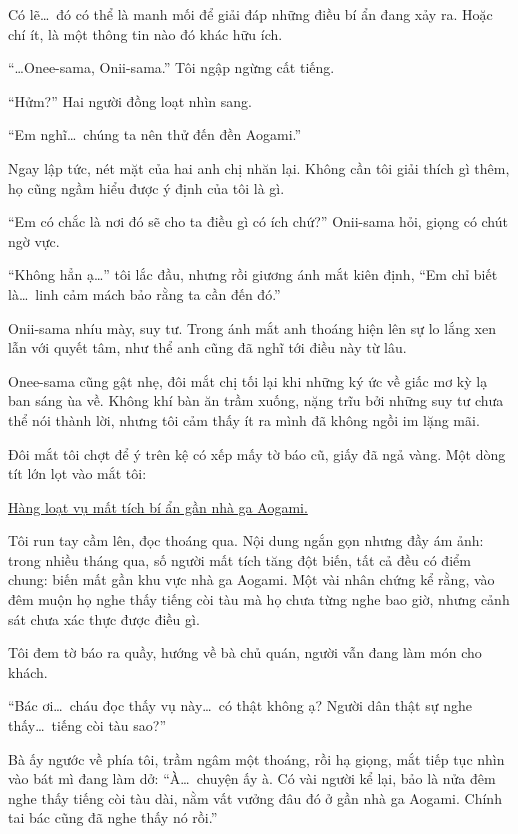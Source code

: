 \documentclass[../main.tex]{subfiles}
\begin{document}
Có lẽ\dots\ đó có thể là manh mối để giải đáp những điều bí ẩn đang xảy ra. Hoặc chí ít, là một thông tin nào đó khác hữu ích.

``\dots Onee-sama, Onii-sama.'' Tôi ngập ngừng cất tiếng.

``Hửm?'' Hai người đồng loạt nhìn sang.

``Em nghĩ\dots\ chúng ta nên thử đến đền Aogami.''

Ngay lập tức, nét mặt của hai anh chị nhăn lại. Không cần tôi giải thích gì thêm, họ cũng ngầm hiểu được ý định của tôi là gì.

``Em có chắc là nơi đó sẽ cho ta điều gì có ích chứ?'' Onii-sama hỏi, giọng có chút ngờ vực.

``Không hẳn ạ\dots'' tôi lắc đầu, nhưng rồi giương ánh mắt kiên định, ``Em chỉ biết là\dots\ linh cảm mách bảo rằng ta cần đến đó.''

Onii-sama nhíu mày, suy tư. Trong ánh mắt anh thoáng hiện lên sự lo lắng xen lẫn với quyết tâm, như thể anh cũng đã nghĩ tới điều này từ lâu.

Onee-sama cũng gật nhẹ, đôi mắt chị tối lại khi những ký ức về giấc mơ kỳ lạ ban sáng ùa về. Không khí bàn ăn trầm xuống, nặng trĩu bởi những suy tư chưa thể nói thành lời, nhưng tôi cảm thấy ít ra mình đã không ngồi im lặng mãi.

Đôi mắt tôi chợt để ý trên kệ có xếp mấy tờ báo cũ, giấy đã ngả vàng. Một dòng tít lớn lọt vào mắt tôi:

\begin{center}
  \uline{Hàng loạt vụ mất tích bí ẩn gần nhà ga Aogami.}
\end{center}

Tôi run tay cầm lên, đọc thoáng qua. Nội dung ngắn gọn nhưng đầy ám ảnh: trong nhiều tháng qua, số người mất tích tăng đột biến, tất cả đều có điểm chung: biến mất gần khu vực nhà ga Aogami. Một vài nhân chứng kể rằng, vào đêm muộn họ nghe thấy tiếng còi tàu mà họ chưa từng nghe bao giờ, nhưng cảnh sát chưa xác thực được điều gì.

Tôi đem tờ báo ra quầy, hướng về bà chủ quán, người vẫn đang làm món cho khách.

``Bác ơi\dots\ cháu đọc thấy vụ này\dots\ có thật không ạ? Người dân thật sự nghe thấy\dots\ tiếng còi tàu sao?''

Bà ấy ngước về phía tôi, trầm ngâm một thoáng, rồi hạ giọng, mắt tiếp tục nhìn vào bát mì đang làm dở: ``À\dots\ chuyện ấy à. Có vài người kể lại, bảo là nửa đêm nghe thấy tiếng còi tàu dài, nằm vất vưởng đâu đó ở gần nhà ga Aogami. Chính tai bác cũng đã nghe thấy nó rồi.''
\end{document}
